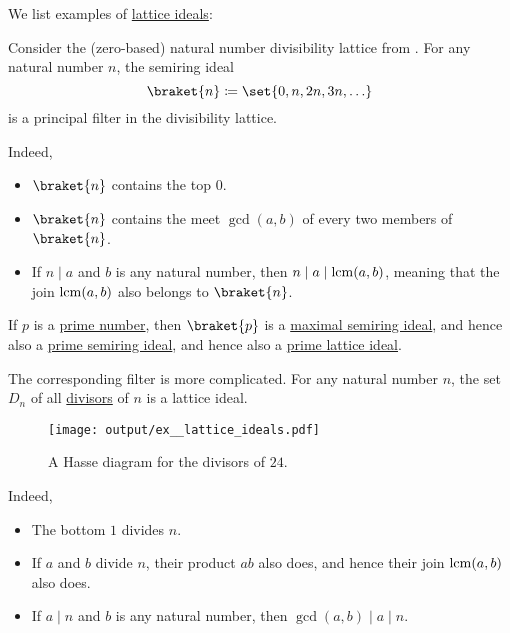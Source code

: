 \begin{example}\label{ex:lattice_ideals}
  We list examples of \hyperref[thm:lattice_ideals]{lattice ideals}:
  \begin{thmenum}
     Consider the (zero-based) natural number divisibility lattice from . For any natural number \( n \), the semiring ideal
    \begin{equation*}
      \braket{ n } \coloneqq \set{ 0, n, 2n, 3n, \ldots }
    \end{equation*}
    is a principal filter in the divisibility lattice.

    Indeed,
    \begin{itemize}
      \item \( \braket{ n } \) contains the top \( 0 \).
      \item \( \braket{ n } \) contains the meet \( \gcd(a, b) \) of every two members of \( \braket{ n } \).
      \item If \( n \mid a \) and \( b \) is any natural number, then \( n \mid a \mid \operatorname{lcm}(a, b) \), meaning that the join \( \operatorname{lcm}(a, b) \) also belongs to \( \braket{ n } \).
    \end{itemize}

    If \( p \) is a \hyperref[def:prime_number]{prime number}, then \( \braket{ p } \) is a \hyperref[def:semiring_ideal/maximal]{maximal semiring ideal}, and hence also a \hyperref[def:semiring_ideal/prime]{prime semiring ideal}, and hence also a \hyperref[def:lattice_ideal/prime]{prime lattice ideal}.

    The corresponding filter is more complicated. For any natural number \( n \), the set \( D_n \) of all \hyperref[def:divisibility]{divisors} of \( n \) is a lattice ideal.

    \begin{figure}[!ht]
      \centering
      \texttt{[image: output/ex\_\_lattice\_ideals.pdf]}
      \caption{A Hasse diagram for the divisors of \( 24 \).}
      \label{fig:ex:lattice_ideals/lattice}
    \end{figure}

    Indeed,
    \begin{itemize}
      \item The bottom \( 1 \) divides \( n \).
      \item If \( a \) and \( b \) divide \( n \), their product \( ab \) also does, and hence their join \( \operatorname{lcm}(a, b) \) also does.
      \item If \( a \mid n \) and \( b \) is any natural number, then \( \gcd(a, b) \mid a \mid n \).
    \end{itemize}


\end{thmenum}
\end{example}
